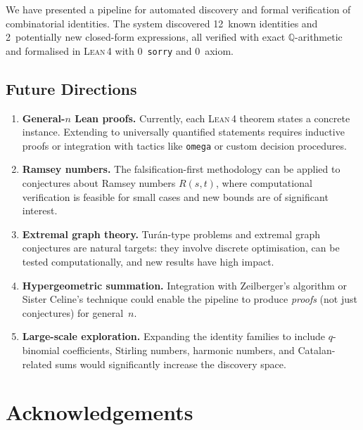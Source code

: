 \documentclass[11pt,a4paper]{article}
\theoremstyle{definition}
\theoremstyle{remark}
\newcommand{\Q}{\mathbb{Q}}
\newcommand{\lean}{\textsc{Lean\,4}}
\newcommand{\sorry}{\texttt{sorry}}
\begin{document}
We have presented a pipeline for automated discovery and
formal verification of combinatorial identities.
The system discovered 12~known identities and 2~potentially new
closed-form expressions, all verified with exact $\Q$-arithmetic
and formalised in \lean{} with 0~\sorry{} and 0~axiom.

\subsection*{Future Directions}

\begin{enumerate}
  \item \textbf{General-$n$ Lean proofs.}
        Currently, each \lean{} theorem states a concrete instance.
        Extending to universally quantified statements requires
        inductive proofs or integration with tactics like
        \texttt{omega} or custom decision procedures.

  \item \textbf{Ramsey numbers.}
        The falsification-first methodology can be applied to
        conjectures about Ramsey numbers $R(s,t)$, where
        computational verification is feasible for small cases
        and new bounds are of significant interest.

  \item \textbf{Extremal graph theory.}
        Tur\'an-type problems and extremal graph conjectures
        are natural targets: they involve discrete optimisation,
        can be tested computationally, and new results have high
        impact.

  \item \textbf{Hypergeometric summation.}
        Integration with Zeilberger's algorithm or Sister
        Celine's technique could enable the pipeline to produce
        \emph{proofs} (not just conjectures) for general~$n$.

  \item \textbf{Large-scale exploration.}
        Expanding the identity families to include $q$-binomial
        coefficients, Stirling numbers, harmonic numbers, and
        Catalan-related sums would significantly increase the
        discovery space.
\end{enumerate}


\section*{Acknowledgements}
\end{document}

